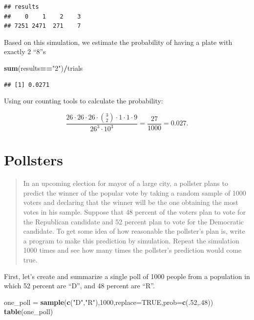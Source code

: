 \documentclass[
]{book}
\newenvironment{Shaded}{\begin{snugshade}}{\end{snugshade}}
\newcommand{\AttributeTok}[1]{\textcolor[rgb]{0.13,0.29,0.53}{#1}}
\newcommand{\ConstantTok}[1]{\textcolor[rgb]{0.56,0.35,0.01}{#1}}
\newcommand{\DecValTok}[1]{\textcolor[rgb]{0.00,0.00,0.81}{#1}}
\newcommand{\FunctionTok}[1]{\textcolor[rgb]{0.13,0.29,0.53}{\textbf{#1}}}
\newcommand{\NormalTok}[1]{#1}
\newcommand{\OtherTok}[1]{\textcolor[rgb]{0.56,0.35,0.01}{#1}}
\newcommand{\SpecialCharTok}[1]{\textcolor[rgb]{0.81,0.36,0.00}{\textbf{#1}}}
\newcommand{\StringTok}[1]{\textcolor[rgb]{0.31,0.60,0.02}{#1}}
\theoremstyle{definition}
\theoremstyle{definition}
\theoremstyle{definition}
\theoremstyle{definition}
\theoremstyle{remark}
\begin{document}
\begin{verbatim}
## results
##    0    1    2    3 
## 7251 2471  271    7
\end{verbatim}

Based on this simulation, we estimate the probability of having a plate with exactly 2 ``8''s

\begin{Shaded}
\begin{Highlighting}[]
\FunctionTok{sum}\NormalTok{(results}\SpecialCharTok{==}\StringTok{"2"}\NormalTok{)}\SpecialCharTok{/}\NormalTok{trials}
\end{Highlighting}
\end{Shaded}

\begin{verbatim}
## [1] 0.0271
\end{verbatim}

Using our counting tools to calculate the probability:

\[\frac{26\cdot 26\cdot 26 \cdot \binom{3}{2} \cdot 1 \cdot 1 \cdot 9}{26^3\cdot 10^3}= \frac{27}{1000} = 0.027.\]

\section{Pollsters}\label{pollsters-R}

\begin{quote}
In an upcoming election for mayor of a large city, a pollster plans to predict the winner of the popular vote by taking a random sample of 1000 voters and declaring that the winner will be the one obtaining the most votes in his sample. Suppose that 48 percent of the voters plan to vote for the Republican candidate and 52 percent plan to vote for the Democratic candidate. To get some idea of how reasonable the pollster's plan is, write a program to make this prediction by simulation. Repeat the simulation 1000 times and see how many times the pollster's prediction would come true.
\end{quote}

First, let's create and summarize a single poll of 1000 people from a population in which 52 percent are ``D'', and 48 percent are ``R''.

\begin{Shaded}
\begin{Highlighting}[]
\NormalTok{one\_poll }\OtherTok{=} \FunctionTok{sample}\NormalTok{(}\FunctionTok{c}\NormalTok{(}\StringTok{"D"}\NormalTok{,}\StringTok{"R"}\NormalTok{),}\DecValTok{1000}\NormalTok{,}\AttributeTok{replace=}\ConstantTok{TRUE}\NormalTok{,}\AttributeTok{prob=}\FunctionTok{c}\NormalTok{(.}\DecValTok{52}\NormalTok{,.}\DecValTok{48}\NormalTok{))}
\FunctionTok{table}\NormalTok{(one\_poll)}
\end{Highlighting}
\end{Shaded}
\end{document}
